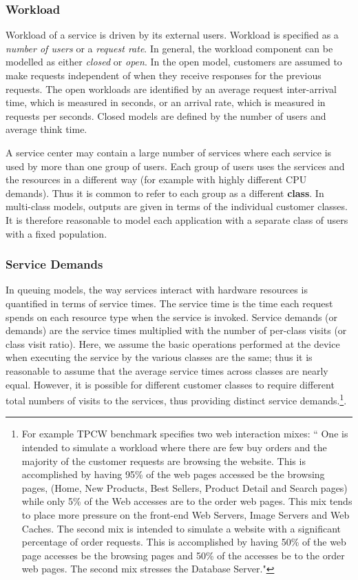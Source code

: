 \documentclass[11pt]{article}
\begin{document}
  
	\subsubsection{Workload} 
	Workload of a service is driven by its external users. Workload is specified as a \textit{number of users} or a \textit{request rate}. In general, the workload component can be modelled as either {\it closed} or {\it open}. In the open model, customers are assumed to make requests independent of when they receive responses for the previous requests. The open workloads are identified by an average request inter-arrival time, which is measured in seconds, or an arrival rate, which is measured in requests per seconds.
	Closed models are defined by the number of users and average think time.
	
	A service center may contain a large number of services where each service is used by more than one group of users. Each group of users uses the services and the resources in a different way (for example with highly different CPU demands). Thus it is common to refer to each group as a different \textbf{class}. In multi-class models, outputs are given in terms of the individual customer classes. It is therefore reasonable to model each application with a separate class of users with a fixed population. 
	 
	\subsubsection{Service Demands}
	 In queuing models, the way services interact with hardware resources is quantified in terms of service times.  The service time is the time each request spends on each resource type when the service is invoked. Service demands (or demands) are the service times multiplied with the number of per-class visits (or class visit ratio). Here, we assume the basic operations performed at the device when executing the service by the various classes are the  same; thus it is  reasonable  to  assume  that  the  average  service  times across classes are nearly equal. However, it is possible for different customer classes to require different total numbers of visits to the services, thus providing distinct service demands.\footnote{For example TPCW benchmark specifies two web interaction mixes: `` One is intended to simulate a workload where there are few buy orders and the majority of the customer requests are browsing the website. This is accomplished by having 95\% of the web pages accessed be the browsing pages, (Home, New Products, Best Sellers, Product Detail and Search pages) while only 5\% of the Web accesses are to the order web pages. This mix tends to place more pressure on the front-end Web Servers, Image Servers and Web Caches. The second mix is intended to simulate a website with a significant percentage of order requests. This is accomplished by having 50\% of the web page accesses be the browsing pages and 50\% of the accesses be to the order web pages. The second mix stresses the Database Server."}.  
	
\end{document}
